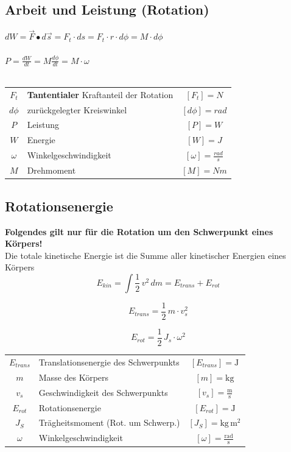 	\subsection{Arbeit und Leistung (Rotation)}
		$dW = \vec{F} \bullet d\vec{s} = F_t \cdot ds = F_t \cdot r \cdot d \phi = M \cdot d \phi $ \\
		\\
		$P = \frac{dW}{dt} = M \frac{d \phi}{dt} = M \cdot \omega$ \\
		\\
		\begin{tabular}{c l c}
			$F_t$ & \textbf{Tantentialer} Kraftanteil der Rotation & $[F_t] = N$ \\
			$d \phi$ & zurückgelegter Kreiswinkel & $[d \phi] = rad$ \\	
			$P$ & Leistung  & $[P] = W$ \\
			$W$ & Energie  & $[W] = J$ \\
			$\omega$ & Winkelgeschwindigkeit & $[\omega] = \frac{rad}{s}$ \\
			$M$ & Drehmoment & $[M] = Nm$ \\
		\end{tabular}

	\subsection{Rotationsenergie}
		\textbf{Folgendes gilt nur für die Rotation um den Schwerpunkt eines Körpers!} \\
		
		Die totale kinetische Energie ist die Summe aller kinetischer Energien eines Körpers \\
		
		$$ \boxed{ E_{kin} = \int \frac{1}{2} \, v^2 \, dm  = E_{trans} + E_{rot} } $$ 
		
		\begin{minipage}{0.48\linewidth}
			$$ \boxed{ E_{trans} = \frac{1}{2} \, m \cdot v_s^2 } $$ 
		\end{minipage}
		\hfill
		\begin{minipage}{0.48\linewidth}
			$$ \boxed{ E_{rot} = \frac{1}{2} \, J_s \cdot \omega^2 } $$ 
		\end{minipage}

		\begin{tabular}{c l c}
			$E_{trans}$ & Translationsenergie des Schwerpunkts & $[E_{trans}] = \mathrm{J}$ \\
			$m$ & Masse des Körpers & $[m] = \mathrm{kg}$ \\
			$v_s$ & Geschwindigkeit des Schwerpunkts & $[v_s] = \mathrm{\frac{m}{s}}$ \\
			$E_{rot}$ & Rotationsenergie & $[E_{rot}] = \mathrm{J}$ \\
			$J_S$ & Trägheitsmoment (Rot. um Schwerp.)  & $[J_S] = \mathrm{kg \, m^2}$ \\
			$\omega$ & Winkelgeschwindigkeit & $[\omega] = \mathrm{\frac{rad}{s}}$ \\
		\end{tabular}
	 
